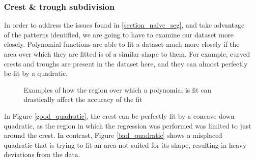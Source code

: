 \documentclass[12pt, a4paper]{article}
\begin{document}
\subsubsection{Crest \& trough subdivision}
In order to address the issues found in \ref{section_naive_seg}, and take
advantage of the patterns identified, we are going to have to examine our
dataset more closely. Polynomial functions are able to fit a dataset
much more closely if the area over which they are fitted is of a similar shape
to them. For example, curved crests and troughs are present in the dataset here,
and they can almost perfectly be fit by a quadratic.

\begin{figure}[H]
    \centering
    \caption{ Examples of how the region over which a polynomial is fit can
    drastically affect the accuracy of the fit }
    \label{bad_good_quadratics}
\end{figure}

In Figure \ref{good_quadratic}, the crest can be perfectly fit by a concave down
quadratic, as the region in which the regression was performed was limited to
just around the crest. In contrast, Figure \ref{bad_quadratic} shows a misplaced
quadratic that is trying to fit an area not suited for its shape, resulting in
heavy deviations from the data.
\end{document}
